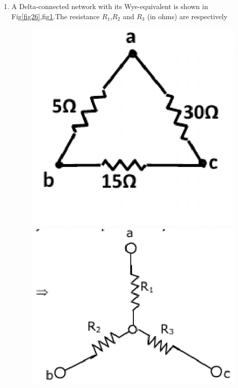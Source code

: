 \documentclass[journal,12pt,twocolumn]{IEEEtran}
\begin{document}
\begin{enumerate}
\item A Delta-connected network with its Wye-equivalent is shown in Fig\ref{fig26},fig\ref{fig27}.The resistance $R_{1}$,$R_{2}$ and $R_{3}$  (in ohms) are respectively
\begin{figure}[!h]
\begin{center}
\includegraphics[scale=0.5]{./figs/fig26.eps}
\caption{}
\label{fig26}
\includegraphics[scale=0.5]{./figs/fig27.eps}
\caption{}
\label{fig27}
\end{center}
\end{figure}



\end{enumerate}
\end{document}

